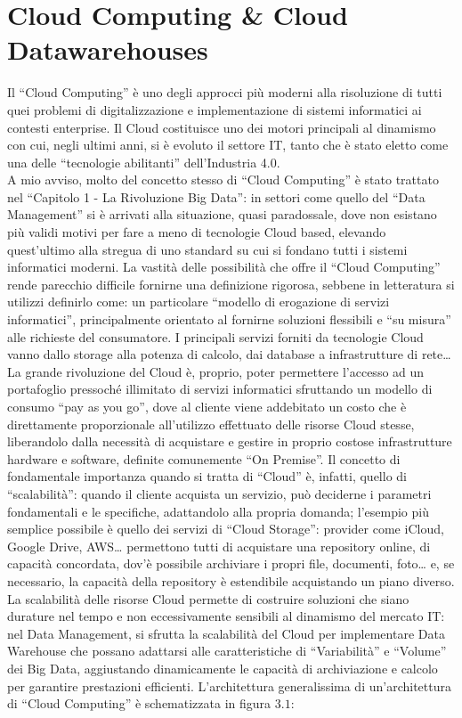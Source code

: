 \documentclass[a4paper,12pt]{report}
\begin{document}
\chapter{Cloud Computing \& Cloud Datawarehouses}
\thispagestyle{empty} %
\fancyhead{} %
\fancyhead[R]{\thepage} %
Il “Cloud Computing” è uno degli approcci più moderni alla risoluzione di tutti quei problemi di digitalizzazione e implementazione di sistemi informatici ai contesti enterprise. Il Cloud costituisce uno dei motori principali al dinamismo con cui, negli ultimi anni, si è evoluto il settore IT, tanto che è stato eletto come una delle “tecnologie abilitanti” dell’Industria 4.0. 
\\[0ex]
A mio avviso, molto del concetto stesso di “Cloud Computing” è stato trattato nel “Capitolo 1 - La Rivoluzione Big Data”: in settori come quello del “Data Management” si è arrivati alla situazione, quasi paradossale, dove non esistano più validi motivi per fare a meno di tecnologie Cloud based, elevando quest’ultimo alla stregua di uno standard su cui si fondano tutti i sistemi informatici moderni. La vastità delle possibilità che offre il “Cloud Computing” rende parecchio difficile fornirne una definizione rigorosa, sebbene in letteratura si utilizzi definirlo come: un particolare “modello di erogazione di servizi informatici”, principalmente orientato al fornirne soluzioni flessibili e “su misura” alle richieste del consumatore. I principali servizi forniti da tecnologie Cloud vanno dallo storage alla potenza di calcolo, dai database a infrastrutture di rete… La grande rivoluzione del Cloud è, proprio, poter permettere l’accesso ad un portafoglio pressoché illimitato di servizi informatici sfruttando un modello di consumo “pay as you go”, dove al cliente viene addebitato un costo che è direttamente proporzionale all’utilizzo effettuato delle risorse Cloud stesse, liberandolo dalla necessità di acquistare e gestire in proprio costose infrastrutture hardware e software, definite comunemente “On Premise”. Il concetto di fondamentale importanza quando si tratta di “Cloud” è, infatti, quello di “scalabilità”: quando il cliente acquista un servizio, può deciderne i parametri fondamentali e le specifiche, adattandolo alla propria domanda; l’esempio più semplice possibile è quello dei servizi di “Cloud Storage”: provider come iCloud, Google Drive, AWS… permettono tutti di acquistare una repository online, di capacità concordata, dov’è possibile archiviare i propri file, documenti, foto… e, se necessario, la capacità della repository è estendibile acquistando un piano diverso. La scalabilità delle risorse Cloud permette di costruire soluzioni che siano durature nel tempo e non eccessivamente sensibili al dinamismo del mercato IT: nel Data Management, si sfrutta la scalabilità del Cloud per implementare Data Warehouse che possano adattarsi alle caratteristiche di “Variabilità” e “Volume” dei Big Data, aggiustando dinamicamente le capacità di archiviazione e calcolo per garantire prestazioni efficienti.
L’architettura generalissima di un’architettura di “Cloud Computing” è schematizzata in figura $3.1$:
\end{document}
